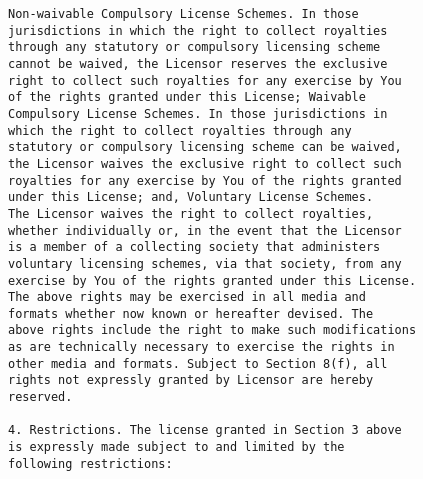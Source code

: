 \begin{verbatim}
Non-waivable Compulsory License Schemes. In those
jurisdictions in which the right to collect royalties
through any statutory or compulsory licensing scheme
cannot be waived, the Licensor reserves the exclusive
right to collect such royalties for any exercise by You
of the rights granted under this License; Waivable
Compulsory License Schemes. In those jurisdictions in
which the right to collect royalties through any
statutory or compulsory licensing scheme can be waived,
the Licensor waives the exclusive right to collect such
royalties for any exercise by You of the rights granted
under this License; and, Voluntary License Schemes.
The Licensor waives the right to collect royalties,
whether individually or, in the event that the Licensor
is a member of a collecting society that administers
voluntary licensing schemes, via that society, from any
exercise by You of the rights granted under this License.
The above rights may be exercised in all media and
formats whether now known or hereafter devised. The
above rights include the right to make such modifications
as are technically necessary to exercise the rights in
other media and formats. Subject to Section 8(f), all
rights not expressly granted by Licensor are hereby
reserved.

4. Restrictions. The license granted in Section 3 above
is expressly made subject to and limited by the
following restrictions:


\end{verbatim}
